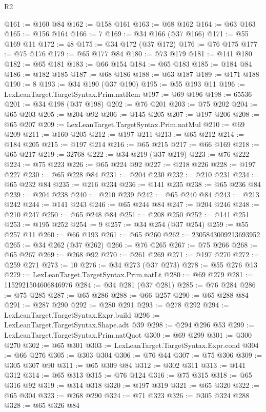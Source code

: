 \begin{lexlean}{R2}
\begin{coremodule}
@161 := @160 @84
@162 := @158 @161
@163 := @68 @162
@164 := @63 @163
@165 := @156 @164
@166 := 7
@169 := @34 @166 (@37 @166)
@171 := @55 @169 @11
@172 := 48
@175 := @34 @172 (@37 @172)
@176 := @76 @175
@177 := @75 @176
@179 := @65 @177 @84
@180 := @73 @179
@181 := @141 @180
@182 := @65 @181
@183 := @66 @154
@184 := @65 @183
@185 := @184 @84
@186 := @182 @185
@187 := @68 @186
@188 := @63 @187
@189 := @171 @188
@190 := 8
@193 := @34 @190 (@37 @190)
@195 := @55 @193 @11
@196 := LexLeanTarget.TargetSyntax.Prim.natRem
@197 := @69 @196
@198 := 65536
@201 := @34 @198 (@37 @198)
@202 := @76 @201
@203 := @75 @202
@204 := @65 @203
@205 := @204 @92
@206 := @145 @205
@207 := @197 @206
@208 := @65 @207
@209 := LexLeanTarget.TargetSyntax.Prim.natMul
@210 := @69 @209
@211 := @160 @205
@212 := @197 @211
@213 := @65 @212
@214 := @184 @205
@215 := @197 @214
@216 := @65 @215
@217 := @66 @169
@218 := @65 @217
@219 := 32768
@222 := @34 @219 (@37 @219)
@223 := @76 @222
@224 := @75 @223
@226 := @65 @224 @92
@227 := @218 @226
@228 := @197 @227
@230 := @65 @228 @84
@231 := @204 @230
@232 := @210 @231
@234 := @65 @232 @84
@235 := @216 @234
@236 := @141 @235
@238 := @65 @236 @84
@239 := @204 @238
@240 := @210 @239
@242 := @65 @240 @84
@243 := @213 @242
@244 := @141 @243
@246 := @65 @244 @84
@247 := @204 @246
@248 := @210 @247
@250 := @65 @248 @84
@251 := @208 @250
@252 := @141 @251
@253 := @195 @252
@254 := 9
@257 := @34 @254 (@37 @254)
@259 := @55 @257 @11
@260 := @66 @193
@261 := @65 @260
@262 := 2305843009213693952
@265 := @34 @262 (@37 @262)
@266 := @76 @265
@267 := @75 @266
@268 := @65 @267
@269 := @268 @92
@270 := @261 @269
@271 := @197 @270
@272 := @259 @271
@273 := 10
@276 := @34 @273 (@37 @273)
@278 := @55 @276 @13
@279 := LexLeanTarget.TargetSyntax.Prim.natLt
@280 := @69 @279
@281 := 1152921504606846976
@284 := @34 @281 (@37 @281)
@285 := @76 @284
@286 := @75 @285
@287 := @65 @286
@288 := @66 @257
@290 := @65 @288 @84
@291 := @287 @290
@292 := @280 @291
@293 := @278 @292
@294 := LexLeanTarget.TargetSyntax.Expr.build
@296 := LexLeanTarget.TargetSyntax.Shape.adt @39
@298 := @294 @296 @53
@299 := LexLeanTarget.TargetSyntax.Prim.natQuot
@300 := @69 @299
@301 := @300 @270
@302 := @65 @301
@303 := LexLeanTarget.TargetSyntax.Expr.cond
@304 := @66 @276
@305 := @303 @304
@306 := @76 @44
@307 := @75 @306
@309 := @305 @307 @90
@311 := @65 @309 @84
@312 := @302 @311
@313 := @141 @312
@314 := @65 @313
@315 := @76 @124
@316 := @75 @315
@318 := @65 @316 @92
@319 := @314 @318
@320 := @197 @319
@321 := @65 @320
@322 := @65 @304
@323 := @268 @290
@324 := @71 @323
@326 := @305 @324 @288
@328 := @65 @326 @84

\end{coremodule}
\end{lexlean}
